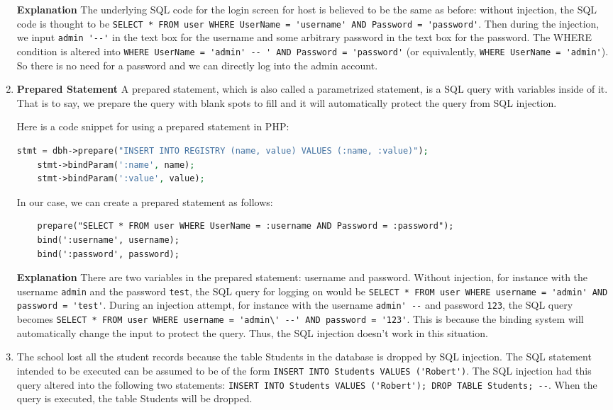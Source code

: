 \begin{enumerate}
\begin{center}
  \end{center}
  \textbf{Explanation} The underlying SQL code for the login screen for host  is believed to be the same as before: without injection, the SQL code is thought to be \lstinline{SELECT * FROM user WHERE UserName = 'username' AND Password = 'password'}. Then during the injection, we input \lstinline{admin '--'} in the text box for the username and some arbitrary password in the text box for the password. The WHERE condition is altered into \lstinline{WHERE UserName = 'admin' -- ' AND Password = 'password'} (or equivalently, \lstinline{WHERE UserName = 'admin'}). So there is no need for a password and we can directly log into the admin account.
\item \textbf{Prepared Statement} 
  A prepared statement, which is also called a parametrized statement, is a SQL query with variables inside of it. That is to say, we prepare the query with blank spots to fill and it will automatically protect the query from SQL injection.

  Here is a code snippet for using a prepared statement in PHP\cite{php}:
  \begin{lstlisting}[language = php]
    stmt = dbh->prepare("INSERT INTO REGISTRY (name, value) VALUES (:name, :value)");
    stmt->bindParam(':name', name);
    stmt->bindParam(':value', value);
  \end{lstlisting}

  In our case, we can create a prepared statement as follows:
  \begin{lstlisting}
    prepare("SELECT * FROM user WHERE UserName = :username AND Password = :password");
    bind(':username', username);
    bind(':password', password);
  \end{lstlisting}
  
  \textbf{Explanation}
  There are two variables in the prepared statement: username and password. Without injection, for instance with the username \lstinline{admin} and the password \lstinline{test}, the SQL query for logging on would be \lstinline{SELECT * FROM user WHERE username = 'admin' AND password = 'test'}. During an injection attempt, for instance with the username \lstinline{admin' --} and password \lstinline{123}, the SQL query becomes \lstinline{SELECT * FROM user WHERE username = 'admin\' --' AND password = '123'}. This is because the binding system will automatically change the input to protect the query. Thus, the SQL injection doesn't work in this situation.
\item The school lost all the student records because the table Students in the database is dropped by SQL injection. The SQL statement intended to be executed can be assumed to be of the form \lstinline{INSERT INTO Students VALUES ('Robert')}. The SQL injection had this query altered into the following two statements: \lstinline{INSERT INTO Students VALUES ('Robert'); DROP TABLE Students; --}. When the query is executed, the table Students will be dropped.


\end{enumerate}
